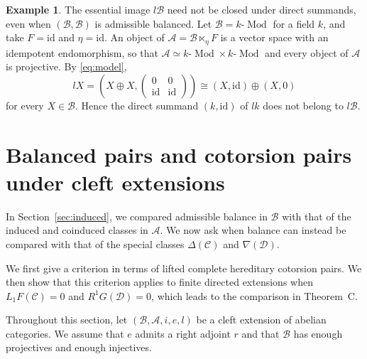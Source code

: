\documentclass[11pt]{amsart}
\theoremstyle{definition}
\newtheorem{example}[theorem]{Example}
\theoremstyle{remark}
\theoremstyle{plain}
\numberwithin{equation}{section}
\begin{document}
\begin{example}\label{ex:summands}
The essential image $l\mathcal{B}$ need not be closed under direct summands, even when
$(\mathcal{B}, \mathcal{B})$ is admissible balanced. Let $\mathcal{B} = k\text{-}\operatorname{Mod}$ for a field
$k$, and take $F = \mathrm{id}$ and $\eta = \mathrm{id}$. An object of
$\mathcal{A} = \mathcal{B} \ltimes_\eta F$ is a vector space with an idempotent endomorphism,
so that $\mathcal{A} \simeq k\text{-}\operatorname{Mod} \times k\text{-}\operatorname{Mod}$ and every object of
$\mathcal{A}$ is projective. By \eqref{eq:model},
\[
 lX = \left(X \oplus X, \begin{pmatrix}0 & 0\\ \mathrm{id} & \mathrm{id}\end{pmatrix}\right)
\cong (X, \mathrm{id}) \oplus (X, 0)
\]
for every $X \in \mathcal{B}$. Hence the direct summand $(k, \mathrm{id})$ of $lk$ does not
belong to $l\mathcal{B}$.
\end{example}

\section{Balanced pairs and cotorsion pairs under cleft extensions}\label{sec:structural}

In Section~\ref{sec:induced}, we compared admissible balance in $\mathcal{B}$ with
that of the induced and coinduced classes in $\mathcal{A}$. We now ask when balance
can instead be compared with that of the special classes $\Delta(\mathcal{C})$
and $\nabla(\mathcal{D})$.

We first give a criterion in terms of lifted complete hereditary cotorsion
pairs. We then show that this criterion applies to finite directed
extensions when $L_1F(\mathcal{C}) = 0$ and $R^1G(\mathcal{D}) = 0$, which leads to the
comparison in Theorem~C.

Throughout this section, let $(\mathcal{B},\mathcal{A},i,e,l)$ be a cleft extension of abelian categories. We assume that $e$
admits a right adjoint $r$ and that $\mathcal{B}$ has enough projectives and enough injectives.
\end{document}
